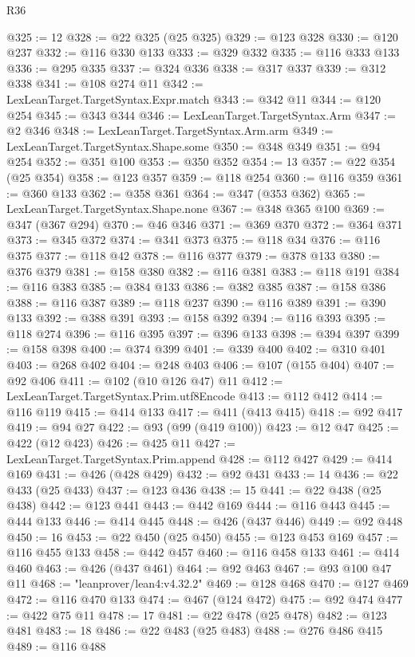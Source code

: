 \begin{lexlean}{R36}
\begin{coremodule}
@325 := 12
@328 := @22 @325 (@25 @325)
@329 := @123 @328
@330 := @120 @237
@332 := @116 @330 @133
@333 := @329 @332
@335 := @116 @333 @133
@336 := @295 @335
@337 := @324 @336
@338 := @317 @337
@339 := @312 @338
@341 := @108 @274 @11
@342 := LexLeanTarget.TargetSyntax.Expr.match
@343 := @342 @11
@344 := @120 @254
@345 := @343 @344
@346 := LexLeanTarget.TargetSyntax.Arm
@347 := @2 @346
@348 := LexLeanTarget.TargetSyntax.Arm.arm
@349 := LexLeanTarget.TargetSyntax.Shape.some
@350 := @348 @349
@351 := @94 @254
@352 := @351 @100
@353 := @350 @352
@354 := 13
@357 := @22 @354 (@25 @354)
@358 := @123 @357
@359 := @118 @254
@360 := @116 @359
@361 := @360 @133
@362 := @358 @361
@364 := @347 (@353 @362)
@365 := LexLeanTarget.TargetSyntax.Shape.none
@367 := @348 @365 @100
@369 := @347 (@367 @294)
@370 := @46 @346
@371 := @369 @370
@372 := @364 @371
@373 := @345 @372
@374 := @341 @373
@375 := @118 @34
@376 := @116 @375
@377 := @118 @42
@378 := @116 @377
@379 := @378 @133
@380 := @376 @379
@381 := @158 @380
@382 := @116 @381
@383 := @118 @191
@384 := @116 @383
@385 := @384 @133
@386 := @382 @385
@387 := @158 @386
@388 := @116 @387
@389 := @118 @237
@390 := @116 @389
@391 := @390 @133
@392 := @388 @391
@393 := @158 @392
@394 := @116 @393
@395 := @118 @274
@396 := @116 @395
@397 := @396 @133
@398 := @394 @397
@399 := @158 @398
@400 := @374 @399
@401 := @339 @400
@402 := @310 @401
@403 := @268 @402
@404 := @248 @403
@406 := @107 (@155 @404)
@407 := @92 @406
@411 := @102 (@10 @126 @47) @11
@412 := LexLeanTarget.TargetSyntax.Prim.utf8Encode
@413 := @112 @412
@414 := @116 @119
@415 := @414 @133
@417 := @411 (@413 @415)
@418 := @92 @417
@419 := @94 @27
@422 := @93 (@99 (@419 @100))
@423 := @12 @47
@425 := @422 (@12 @423)
@426 := @425 @11
@427 := LexLeanTarget.TargetSyntax.Prim.append
@428 := @112 @427
@429 := @414 @169
@431 := @426 (@428 @429)
@432 := @92 @431
@433 := 14
@436 := @22 @433 (@25 @433)
@437 := @123 @436
@438 := 15
@441 := @22 @438 (@25 @438)
@442 := @123 @441
@443 := @442 @169
@444 := @116 @443
@445 := @444 @133
@446 := @414 @445
@448 := @426 (@437 @446)
@449 := @92 @448
@450 := 16
@453 := @22 @450 (@25 @450)
@455 := @123 @453 @169
@457 := @116 @455 @133
@458 := @442 @457
@460 := @116 @458 @133
@461 := @414 @460
@463 := @426 (@437 @461)
@464 := @92 @463
@467 := @93 @100 @47 @11
@468 := "leanprover/lean4:v4.32.2"
@469 := @128 @468
@470 := @127 @469
@472 := @116 @470 @133
@474 := @467 (@124 @472)
@475 := @92 @474
@477 := @422 @75 @11
@478 := 17
@481 := @22 @478 (@25 @478)
@482 := @123 @481
@483 := 18
@486 := @22 @483 (@25 @483)
@488 := @276 @486 @415
@489 := @116 @488

\end{coremodule}
\end{lexlean}
